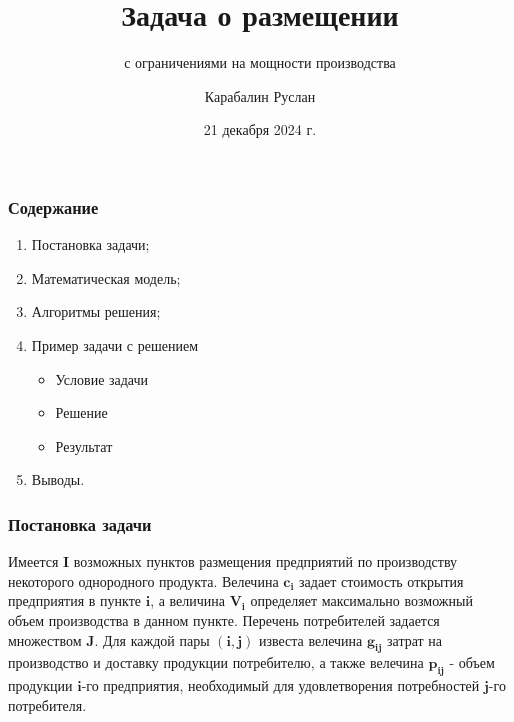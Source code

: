 \documentclass[12pt]{beamer}
\title{Задача о размещении}
\subtitle{с ограничениями на мощности производства}
\author{Карабалин Руслан}
\date{21 декабря 2024 г.}
\begin{document}
	
	\begin{frame}
		\titlepage
	\end{frame}

    \begin{frame}
        \frametitle{Содержание}

        \vspace{-2cm}

        \begin{enumerate}
            \item Постановка задачи;
            \item Математическая модель;
            \item Алгоритмы решения;
            \item Пример задачи с решением
            \begin{itemize}
                \item Условие задачи
                \item Решение
                \item Результат
            \end{itemize}
            \item Выводы.
        \end{enumerate}

    \end{frame}

    \begin{frame}
        \frametitle{Постановка задачи}

        Имеется $\boldsymbol{I}$ возможных пунктов размещения предприятий
        по производству некоторого однородного продукта.
        Велечина $\boldsymbol{c_{i}}$ задает стоимость открытия предприятия
        в пункте $\boldsymbol{i}$, а величина $\boldsymbol{V_{i}}$ определяет максимально
        возможный объем производства в данном пункте.
        Перечень потребителей задается множеством $\boldsymbol{J}$.
        Для каждой пары $\boldsymbol{(i, j)}$ известа велечина $\boldsymbol{g_{ij}}$
        затрат на производство и доставку продукции потребителю,
        а также велечина $\boldsymbol{p_{ij}}$ - объем продукции $\boldsymbol{i}$-го предприятия,
        необходимый для удовлетворения потребностей
        $\boldsymbol{j}$-го потребителя.
        
    \end{frame}
\end{document}
